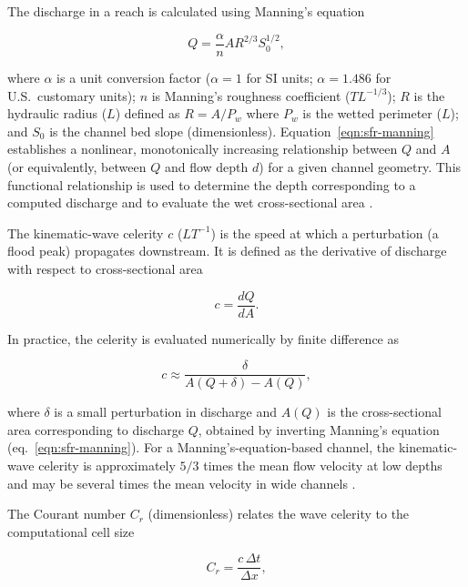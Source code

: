 The discharge in a reach is calculated using Manning's equation \citep{Manning1891}

\begin{equation}
	\label{eqn:sfr-manning}
	Q = \frac{\alpha}{n} A R^{2/3} S_0^{1/2} ,
\end{equation}

\noindent where $\alpha$ is a unit conversion factor ($\alpha = 1$ for SI units; $\alpha = 1.486$ for U.S.~customary units); $n$ is Manning's roughness coefficient ($TL^{-1/3}$); $R$ is the hydraulic radius ($L$) defined as $R = A / P_w$ where $P_w$ is the wetted perimeter ($L$); and $S_0$ is the channel bed slope (dimensionless). Equation~\ref{eqn:sfr-manning} establishes a nonlinear, monotonically increasing relationship between $Q$ and $A$ (or equivalently, between $Q$ and flow depth $d$) for a given channel geometry. This functional relationship is used to determine the depth corresponding to a computed discharge and to evaluate the wet cross-sectional area \citep{chaudhry2008}.

The kinematic-wave celerity $c$ ($LT^{-1}$) is the speed at which a perturbation (a flood peak) propagates downstream. It is defined as the derivative of discharge with respect to cross-sectional area

\begin{equation}
	\label{eqn:sfr-celerity}
	c = \frac{dQ}{dA} .
\end{equation}

\noindent In practice, the celerity is evaluated numerically by finite difference as

\begin{equation}
	\label{eqn:sfr-celerity-num}
	c \approx \frac{\delta}{A(Q + \delta) - A(Q)} ,
\end{equation}

\noindent where $\delta$ is a small perturbation in discharge and $A(Q)$ is the cross-sectional area corresponding to discharge $Q$, obtained by inverting Manning's equation (eq.~\ref{eqn:sfr-manning}). For a Manning's-equation-based channel, the kinematic-wave celerity is approximately $5/3$ times the mean flow velocity at low depths and may be several times the mean velocity in wide channels \citep{LighthillWhitham1955, chaudhry2008}.

The Courant number $C_r$ (dimensionless) relates the wave celerity to the computational cell size

\begin{equation}
	\label{eqn:sfr-courant}
	C_r = \frac{c \, \Delta t}{\Delta x} ,
\end{equation}

